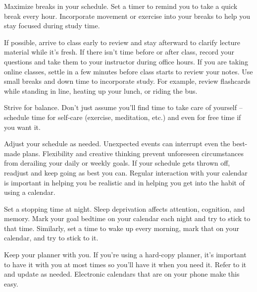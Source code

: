 \documentclass[../main.tex]{subfiles}
\begin{document}
Maximize breaks in your schedule. Set a timer to remind you to take a quick
break every hour. Incorporate movement or exercise into your breaks to help you
stay focused during study time.

If possible, arrive to class early to review and stay afterward to clarify
lecture material while it’s fresh. If there isn’t time before or after class,
record your questions and take them to your instructor during office hours. If
you are taking online classes, settle in a few minutes before class starts to
review your notes. Use small breaks and down time to incorporate study. For
example, review flashcards while standing in line, heating up your lunch, or
riding the bus.

Strive for balance. Don’t just assume you’ll find time to take care of yourself
– schedule time for self-care (exercise, meditation, etc.) and even for free
time if you want it.

Adjust your schedule as needed. Unexpected events can interrupt even the
best-made plans. Flexibility and creative thinking prevent unforeseen
circumstances from derailing your daily or weekly goals. If your schedule gets
thrown off, readjust and keep going as best you can. Regular interaction with
your calendar is important in helping you be realistic and in helping you get
into the habit of using a calendar.

Set a stopping time at night. Sleep deprivation affects attention, cognition,
and memory. Mark your goal bedtime on your calendar each night and try to stick
to that time. Similarly, set a time to wake up every morning, mark that on your
calendar, and try to stick to it.

Keep your planner with you. If you’re using a hard-copy planner, it’s important
to have it with you at most times so you’ll have it when you need it. Refer to
it and update as needed. Electronic calendars that are on your phone make this
easy.
%
\end{document}
